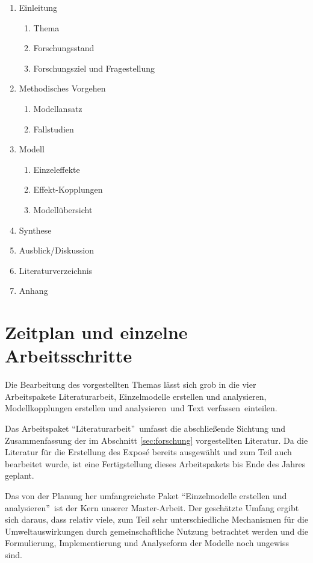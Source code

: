\documentclass[11pt, titlepage=true]{scrartcl} %
\begin{document}
\begin{enumerate}
\item Einleitung
	\begin{enumerate}
		\item Thema
		\item Forschungsstand
		\item Forschungsziel und Fragestellung
	\end{enumerate}
\item Methodisches Vorgehen
	\begin{enumerate}
		\item Modellansatz
		\item Fallstudien
	\end{enumerate}
\item Modell
	\begin{enumerate}
		\item Einzeleffekte
		\item Effekt-Kopplungen
		\item Modellübersicht
	\end{enumerate}

\item Synthese
\item Ausblick/Diskussion
\item Literaturverzeichnis
\item Anhang
\end{enumerate}

\section{Zeitplan und einzelne Arbeitsschritte}
\newcommand{\paketEins}{Literaturarbeit}
\newcommand{\paketZwei}{Einzelmodelle erstellen und analysieren}
\newcommand{\paketDrei}{Modellkopplungen erstellen und analysieren}
\newcommand{\paketVier}{Text verfassen}
Die Bearbeitung des vorgestellten Themas lässt sich grob in die vier
Arbeitspakete \paketEins, \paketZwei, \paketDrei\ und \paketVier\ einteilen. 

Das Arbeitspaket \enquote{\paketEins}\ umfasst die abschließende Sichtung und
Zusammenfassung der im Abschnitt \ref{sec:forschung} vorgestellten Literatur. Da
die Literatur für die Erstellung des Exposé bereits ausgewählt und zum Teil
auch bearbeitet wurde, ist eine Fertigstellung dieses Arbeitspakets bis Ende des
Jahres geplant.

Das von der Planung her umfangreichste Paket \enquote{\paketZwei}\ ist der Kern
unserer Master-Arbeit. Der geschätzte Umfang ergibt sich daraus, dass relativ
viele, zum Teil sehr unterschiedliche Mechanismen für die Umweltauswirkungen
durch gemeinschaftliche Nutzung betrachtet werden und die Formulierung,
Implementierung und Analyseform der Modelle noch ungewiss sind.
\end{document}
